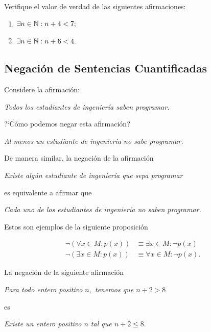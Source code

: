  Verifique el valor de verdad de las siguientes afirmaciones:
 \begin{enumerate}
  \item $\exists n  \in \mathbb{N}: n+4<7;$ 
  \item $\exists n \in \mathbb{N}: n+6<4.$
 \end{enumerate}



\subsection{Negación de Sentencias Cuantificadas}



 Considere la afirmación:
 \begin{center}
  \emph{Todos los estudiantes de ingeniería saben programar.}
 \end{center}
?`Cómo podemos negar esta afirmación?


\begin{center}
 \emph{Al menos un estudiante de ingeniería no sabe programar.}
\end{center} 


 De manera similar, la negación de la afirmación
 \begin{center}
  \emph{Existe algún estudiante de ingeniería que sepa programar}
 \end{center}
 es equivalente a afirmar que 
 \begin{center}
  \emph{Cada uno de los estudiantes de ingeniería no saben programar.}
 \end{center}

Estos son ejemplos de la siguiente proposición

 \begin{teorema}[DeMorgan]
  \begin{align}
  \label{lip:thm:4.4}
   \neg\left( \forall x\in M: p(x) \right)& \equiv \exists x\in M: \neg p(x)\\
   \label{lip:thm:4.5}
   \neg\left( \exists x\in M: p(x) \right)& \equiv \forall x\in M: \neg p(x).
  \end{align}

 \end{teorema}




 \begin{resuelto}
  \label{lip:exmp:4.10.a}
  La negación de la siguiente afirmación
  \begin{center}
   \emph{Para todo entero positivo $n,$ tenemos que $n+2>8$}
  \end{center}
es 
\begin{center}
 \emph{Existe un entero positivo $n$ tal que $n+2 \leq 8.$}
\end{center}

 \end{resuelto}




